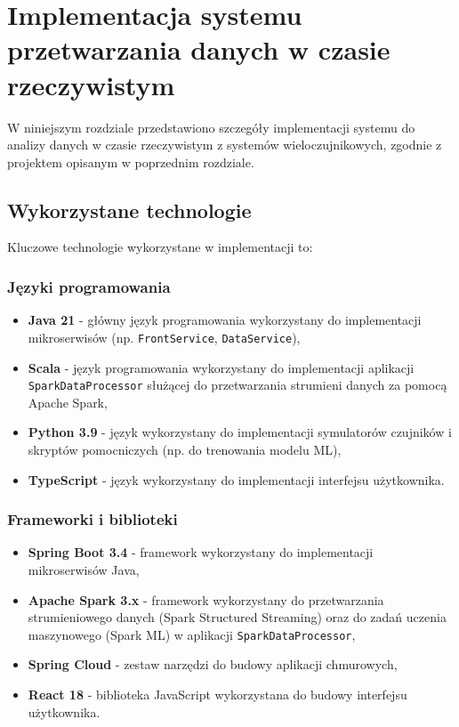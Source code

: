\section{Implementacja systemu przetwarzania danych w czasie rzeczywistym}
\label{sec:implementacja_systemu}

W niniejszym rozdziale przedstawiono szczegóły implementacji systemu do analizy danych w czasie rzeczywistym z systemów wieloczujnikowych,
zgodnie z projektem opisanym w poprzednim rozdziale.

\subsection{Wykorzystane technologie}
\label{subsec:technologie}

Kluczowe technologie wykorzystane w implementacji to:

\subsubsection{Języki programowania}
\label{subsubsec:jezyki_programowania}

\begin{itemize}
    \item \textbf{Java 21} - główny język programowania wykorzystany do implementacji mikroserwisów (np. \texttt{FrontService}, \texttt{DataService}),
    \item \textbf{Scala} - język programowania wykorzystany do implementacji aplikacji \texttt{SparkDataProcessor} służącej do przetwarzania strumieni danych za pomocą Apache Spark,
    \item \textbf{Python 3.9} - język wykorzystany do implementacji symulatorów czujników i skryptów pomocniczych (np. do trenowania modelu ML),
    \item \textbf{TypeScript} - język wykorzystany do implementacji interfejsu użytkownika.
\end{itemize}

\subsubsection{Frameworki i biblioteki}
\label{subsubsec:frameworki}

\begin{itemize}
    \item \textbf{Spring Boot 3.4} - framework wykorzystany do implementacji mikroserwisów Java,
    \item \textbf{Apache Spark 3.x} \cite{spark_streaming} - framework wykorzystany do przetwarzania strumieniowego danych (Spark Structured Streaming) oraz do zadań uczenia maszynowego (Spark ML) w aplikacji \texttt{SparkDataProcessor},
    \item \textbf{Spring Cloud} - zestaw narzędzi do budowy aplikacji chmurowych,
    \item \textbf{React 18} - biblioteka JavaScript wykorzystana do budowy interfejsu użytkownika.
\end{itemize}

